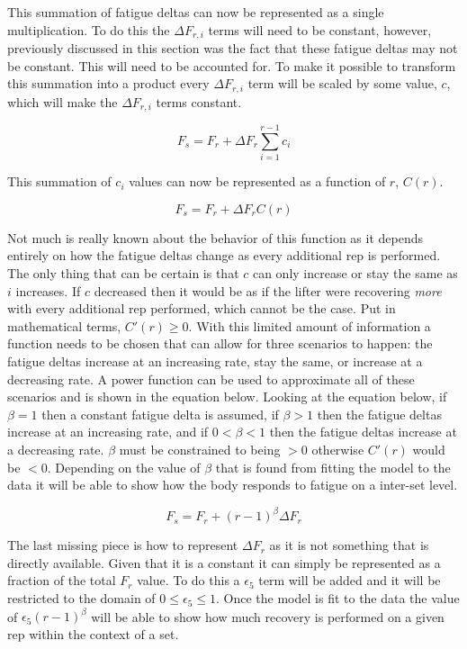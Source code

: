 This summation of fatigue deltas can now be represented as a single multiplication. To do this the $\Delta F_{r,i}$ terms will need to be constant, however, previously discussed in this section was the fact that these fatigue deltas may not be constant. This will need to be accounted for. To make it possible to transform this summation into a product every $\Delta F_{r,i}$ term will be scaled by some value, $c$, which will make the $\Delta F_{r,i}$ terms constant. 

\begin{equation*}
	F_s =
	F_{r} + \Delta F_r \sum_{i=1}^{r-1} c_i
\end{equation*}

This summation of $c_i$ values can now be represented as a function of $r$, $C(r)$.

\begin{equation*}
	F_s =
	F_{r} + \Delta F_r C(r)
\end{equation*}

Not much is really known about the behavior of this function as it depends entirely on how the fatigue deltas change as every additional rep is performed. The only thing that can be certain is that $c$ can only increase or stay the same as $i$ increases. If $c$ decreased then it would be as if the lifter were recovering \textit{more} with every additional rep performed, which cannot be the case. Put in mathematical terms, $C'(r)\ge0$. With this limited amount of information a function needs to be chosen that can allow for three scenarios to happen: the fatigue deltas increase at an increasing rate, stay the same, or increase at a decreasing rate. A power function can be used to approximate all of these scenarios and is shown in the equation below. Looking at the equation below, if $\beta=1$ then a constant fatigue delta is assumed, if $\beta>1$ then the fatigue deltas increase at an increasing rate, and if $0<\beta<1$ then the fatigue deltas increase at a decreasing rate. $\beta$ must be constrained to being $>0$ otherwise $C'(r)$ would be $<0$. Depending on the value of $\beta$ that is found from fitting the model to the data it will be able to show how the body responds to fatigue on a inter-set level.

\begin{equation*}
	F_s =
	F_{r} + (r-1)^\beta \Delta F_r
\end{equation*}

The last missing piece is how to represent $\Delta F_r$ as it is not something that is directly available. Given that it is a constant it can simply be represented as a fraction of the total $F_r$ value. To do this a $\epsilon_5$ term will be added and it will be restricted to the domain of $0 \le \epsilon_5 \le 1$. Once the model is fit to the data the value of $\epsilon_5 (r-1)^\beta$ will be able to show how much recovery is performed on a given rep within the context of a set.

